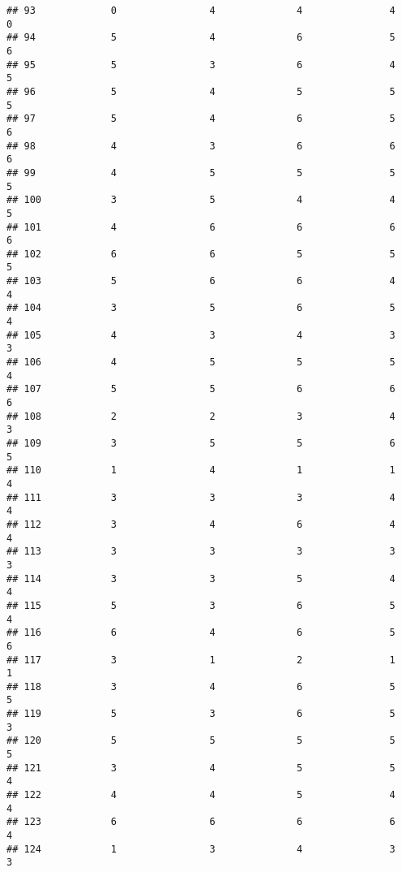 \documentclass[
]{article}
\begin{document}
\begin{verbatim}
## 93             0                4              4               4              0
## 94             5                4              6               5              6
## 95             5                3              6               4              5
## 96             5                4              5               5              5
## 97             5                4              6               5              6
## 98             4                3              6               6              6
## 99             4                5              5               5              5
## 100            3                5              4               4              5
## 101            4                6              6               6              6
## 102            6                6              5               5              5
## 103            5                6              6               4              4
## 104            3                5              6               5              4
## 105            4                3              4               3              3
## 106            4                5              5               5              4
## 107            5                5              6               6              6
## 108            2                2              3               4              3
## 109            3                5              5               6              5
## 110            1                4              1               1              4
## 111            3                3              3               4              4
## 112            3                4              6               4              4
## 113            3                3              3               3              3
## 114            3                3              5               4              4
## 115            5                3              6               5              4
## 116            6                4              6               5              6
## 117            3                1              2               1              1
## 118            3                4              6               5              5
## 119            5                3              6               5              3
## 120            5                5              5               5              5
## 121            3                4              5               5              4
## 122            4                4              5               4              4
## 123            6                6              6               6              4
## 124            1                3              4               3              3

\end{verbatim}
\end{document}
